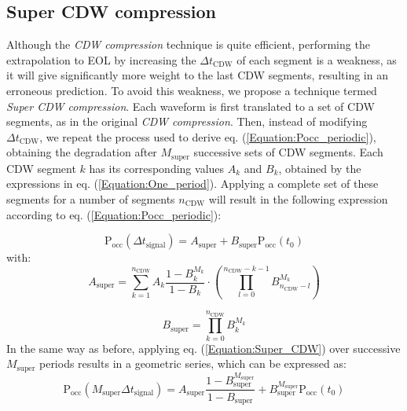 \subsection{Super CDW compression}
\label{subsection:SuperCDWcompression}
Although the \textit{CDW compression} technique is quite efficient, performing the extrapolation to EOL by increasing the $\Delta t_{\text{CDW}}$ of each segment is a weakness, as it will give significantly more weight to the last CDW segments, resulting in an erroneous prediction. To avoid this weakness, we propose a technique termed \textit{Super CDW compression}. Each waveform is first translated to a set of CDW segments, as in the original \textit{CDW compression}. Then, instead of modifying $\Delta t_{\text{CDW}}$, we repeat the process used to derive eq. (\ref{Equation:Pocc_periodic}), obtaining the degradation after $M_{\text{super}}$ successive sets of CDW segments. Each CDW segment $k$ has its corresponding values $A_k$ and $B_k$, obtained by the expressions in eq. (\ref{Equation:One_period}). Applying a complete set of these segments for a number of segments $n_{\text{CDW}}$ will result in the following expression according to eq. (\ref{Equation:Pocc_periodic}):

\begin{equation}
\label{Equation:Super_CDW}
\text{P}_{\text{occ}}(\Delta t_{\text{signal}})=A_{\text{super}} +B_{\text{super}} \text{P}_{\text{occ}}(t_0)
\end{equation}
with:
\begin{equation*}
A_{\text{super}}=\sum_{k=1}^{n_{\text{CDW}}} A_k \frac{1-B_k^{M_k}}{1-B_k} \cdot\left(\prod_{l=0}^{n_{\text{CDW}}-k-1} B_{n_{\text{CDW}}-l}^{M_k}\right)  
\end{equation*}

\begin{equation*}
B_{\text{super}}=\prod_{k=0}^{n_{\text{CDW}}} B_k^{M_k}
\end{equation*}
In the same way as before, applying eq. (\ref{Equation:Super_CDW}) over successive $M_{\text{super}}$ periods results in a geometric series, which can be expressed as:
\begin{equation}
\label{Equation:Super_CDW_periodic}
\text{P}_{\text{occ}}(M_{\text{super}} \Delta t_\text{signal})=A_{\text{super}} \frac{1-B_{\text{super}}^{M_{\text{super}}}}{1-B_{\text{super}}}+B_{\text{super}}^{M_{\text{super}}} \text{P}_{\text{occ}}(t_0)
\end{equation}


